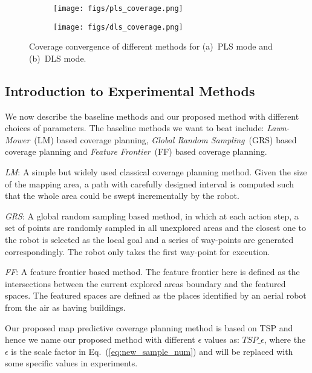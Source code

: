 \begin{figure}%
  \centering
  \begin{subfigure}[b]{0.49\linewidth}
    \texttt{[image: figs/pls\_coverage.png]}
    \caption{}
  \end{subfigure}
  \begin{subfigure}[b]{0.49\linewidth}
    \texttt{[image: figs/dls\_coverage.png]}
    \caption{}
  \end{subfigure}
  \caption{\small Coverage convergence of different methods for (a)~PLS mode and (b)~DLS mode.}
  \label{fig:coverage}
\end{figure}

\subsection{Introduction to Experimental Methods}
We now describe the baseline methods and our proposed method with different choices of parameters. The baseline methods we want to beat include: \textit{Lawn-Mower}~(LM) based coverage planning, \textit{Global Random Sampling}~(GRS) based coverage planning and \textit{Feature Frontier}~(FF) based coverage planning. 

\textit{LM}: A simple but widely used classical coverage planning method. Given the size of the mapping area, a path with carefully designed interval is computed such that the whole area could be swept incrementally by the robot.

\textit{GRS}: A global random sampling based method, in which at each action step, a set of points are randomly sampled in all unexplored areas and the closest one to the robot is selected as the local goal and a series of way-points are generated correspondingly. The robot only takes the first way-point for execution.

\textit{FF}: A feature frontier based method. The feature frontier here is defined as the intersections between the current explored areas boundary and the featured spaces. The featured spaces are defined as the places identified by an aerial robot from the air as having buildings. %

Our proposed map predictive coverage planning method is based on TSP and hence we name our proposed method with different $\epsilon$ values as: $TSP\_\epsilon$, where the $\epsilon$ is the scale factor in Eq.~(\ref{eq:new_sample_num}) and will be replaced with some specific values in experiments.

